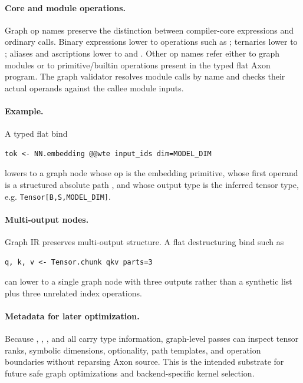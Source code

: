 \paragraph{Core and module operations.}
Graph op names preserve the distinction between compiler-core expressions and
ordinary calls.  Binary expressions lower to operations such as
; ternaries lower to ; aliases and
ascriptions lower to  and .  Other op names
refer either to graph modules or to primitive/builtin operations present in the
typed flat Axon program.  The graph validator resolves module calls by name and
checks their actual operands against the callee module inputs.

\paragraph{Example.}
A typed flat bind
\begin{verbatim}
tok <- NN.embedding @@wte input_ids dim=MODEL_DIM
\end{verbatim}
lowers to a graph node whose op is the embedding primitive, whose first operand
is a structured absolute path , and whose output type is the
inferred tensor type, e.g. \verb|Tensor[B,S,MODEL_DIM]|.

\paragraph{Multi-output nodes.}
Graph IR preserves multi-output structure.  A flat destructuring bind such as
\begin{verbatim}
q, k, v <- Tensor.chunk qkv parts=3
\end{verbatim}
can lower to a single graph node with three outputs rather than a synthetic
list plus three unrelated index operations.

\paragraph{Metadata for later optimization.}
Because , , , and
 all carry type information, graph-level passes can inspect
tensor ranks, symbolic dimensions, optionality, path templates, and operation
boundaries without reparsing Axon source.  This is the intended substrate for
future safe graph optimizations and backend-specific kernel selection.
